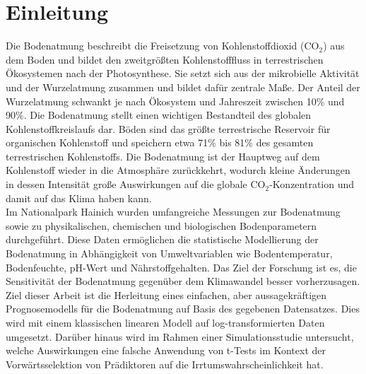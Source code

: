 \section{Einleitung}

Die Bodenatmung beschreibt die Freisetzung von Kohlenstoffdioxid (CO$_2$) aus dem Boden und bildet den 
zweitgrößten Kohlenstofffluss in terrestrischen Ökosystemen nach der Photosynthese. \cite{raich1992global} Sie setzt
sich aus der mikrobielle Aktivität und der Wurzelatmung zusammen und bildet dafür zentrale Maße. 
Der Anteil der Wurzelatmung schwankt je nach Ökosystem und Jahreszeit zwischen 10\% und 90\%. \cite{Hanson2000}
Die Bodenatmung stellt einen wichtigen Bestandteil des globalen Kohlenstoffkreislaufs dar. Böden sind das
größte terrestrische Reservoir für organischen Kohlenstoff und speichern etwa 71\% bis 81\% des gesamten
terrestrischen Kohlenstoffs. \cite{IPCC2001} Die Bodenatmung ist der Hauptweg auf dem Kohlenstoff wieder in die 
Atmosphäre zurückkehrt, wodurch kleine Änderungen in dessen Intensität große Auswirkungen auf die globale 
CO$_2$-Konzentration und damit auf das Klima haben kann. \cite{1997biogeochemistry,IPCC2001,Churkina2003} \\

Im Nationalpark Hainich wurden umfangreiche Messungen zur Bodenatmung sowie zu physikalischen, chemischen und
biologischen Bodenparametern durchgeführt. Diese Daten ermöglichen die statistische Modellierung der Bodenatmung
in Abhängigkeit von Umweltvariablen wie Bodentemperatur, Bodenfeuchte, pH-Wert und Nährstoffgehalten. Das Ziel
der Forschung ist es, die Sensitivität der Bodenatmung gegenüber dem Klimawandel besser vorherzusagen. \cite{diss} \\

Ziel dieser Arbeit ist die Herleitung eines einfachen, aber aussagekräftigen Prognosemodells für die
Bodenatmung auf Basis des gegebenen Datensatzes. Dies wird mit einem klassischen linearen Modell auf
log-transformierten Daten umgesetzt. Darüber hinaus wird im Rahmen einer Simulationsstudie
untersucht, welche Auswirkungen eine falsche Anwendung von t-Tests im Kontext der Vorwärtsselektion von
Prädiktoren auf die Irrtumswahrscheinlichkeit hat.
